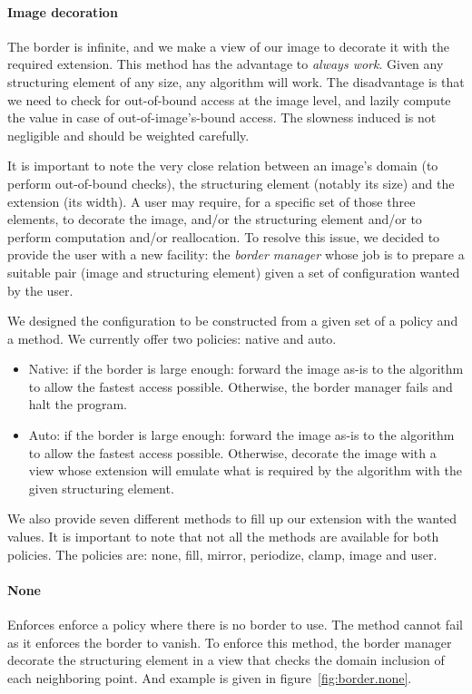 \paragraph{Image decoration}
The border is infinite, and we make a view of our image to decorate it with the required extension. This method has the
advantage to \textit{always work}. Given any structuring element of any size, any algorithm will work. The disadvantage
is that we need to check for out-of-bound access at the image level, and lazily compute the value in case of
out-of-image's-bound access. The slowness induced is not negligible and should be weighted carefully.

\bigskip

It is important to note the very close relation between an image's domain (to perform out-of-bound checks), the
structuring element (notably its size) and the extension (its width). A user may require, for a specific set of those
three elements, to decorate the image, and/or the structuring element and/or to perform computation and/or reallocation.
To resolve this issue, we decided to provide the user with a new facility: the \textit{border manager} whose job is to
prepare a suitable pair (image and structuring element) given a set of configuration wanted by the user.

We designed the configuration to be constructed from a given set of a policy and a method. We currently offer two
policies: native and auto.

\begin{itemize}
  \item Native: if the border is large enough: forward the image as-is to the algorithm to allow the fastest access
        possible. Otherwise, the border manager fails and halt the program.
  \item Auto: if the border is large enough: forward the image as-is to the algorithm to allow the fastest access
        possible. Otherwise, decorate the image with a view whose extension will emulate what is required by the
        algorithm with the given structuring element.
\end{itemize}

We also provide seven different methods to fill up our extension with the wanted values. It is important to note that
not all the methods are available for both policies. The policies are: none, fill, mirror, periodize, clamp, image and
user.

\paragraph{None} Enforces enforce a policy where there is no border to use. The method cannot fail as it enforces the
border to vanish. To enforce this method, the border manager decorate the structuring element in a view that checks the
domain inclusion of each neighboring point. And example is given in figure~\ref{fig:border.none}.

